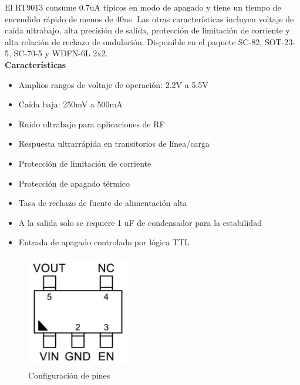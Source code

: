 El RT9013 consume 0.7uA típicos en modo de apagado y tiene un tiempo de encendido rápido de menos de 40us. Las otras características incluyen voltaje de caída ultrabajo, alta precisión de salida, protección de limitación de corriente y alta relación de rechazo de ondulación. Disponible en el paquete SC-82, SOT-23-5, SC-70-5 y WDFN-6L 2x2.\\

\textbf{Características}

\begin{itemize}
    \item Amplios rangos de voltaje de operación: 2.2V a 5.5V
    \item Caída baja: 250mV a 500mA
    \item Ruido ultrabajo para aplicaciones de RF
    \item Respuesta ultrarrápida en transitorios de línea/carga
    \item Protección de limitación de corriente
    \item Protección de apagado térmico
    \item Tasa de rechazo de fuente de alimentación alta
    \item A la salida solo se requiere 1 uF de condensador para la estabilidad
    \item Entrada de apagado controlado por lógica TTL
\end{itemize}

\vspace{1cm}

\begin{figure}[H]
    \centering
    \includegraphics[width=4.5cm, height=5cm]{imagenes/esquematico RT9013.pdf}
    \caption{Configuración de pines}
    \label{imag:pines_RT9013}
\end{figure}


